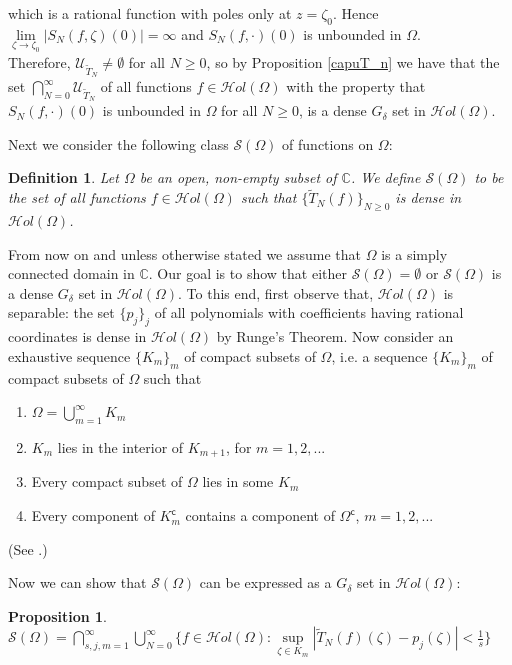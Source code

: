 \documentclass[11pt,twoside,a4paper]{article}
\newtheorem{proposition}[theorem]{Proposition}
\newtheorem{definition}[theorem]{Definition}
\theoremstyle{remark}
\def\d{\delta}
\newcommand{\holo}{{\mathcal Hol}(\Omega)}
\newcommand{\ttn}{\widetilde{T}_N}
\newcommand{\so}{\mathcal{S}(\Omega)}
\begin{document}
which is a rational function with poles only at $z= \zeta_0$. Hence $\lim \limits_{\zeta\rightarrow\zeta_0}|S_N(f,\zeta)(0)| = \infty$ and $S_N(f,\cdot)(0)$ is unbounded in $\Omega$.\\
Therefore, $\mathcal{U}_{\ttn} \neq \emptyset$ for all $N \geq 0$, so by Proposition \ref{capuT_n} we have that the set $\bigcap\limits_{N=0}^{\infty}\mathcal{U}_{\ttn}$ of all functions $f \in \holo$ with the property that $S_N(f,\cdot)(0)$ is unbounded in $\Omega$ for all $N \geq 0$, is a dense $G_\d$ set in $\holo$.
\par
Next we consider the following class $\so$ of functions on $\Omega$:
\begin{definition}
  Let $\Omega$ be an open, non-empty subset of $\mathbb{C}$. We define $\so$ to be the set of all functions $f \in \holo$ such that $\big\{  \ttn(f)\big\}_{N \geq 0}$ is dense in $\holo$.
\end{definition}
\label{so def}
From now on and unless otherwise stated we assume that $\Omega$ is a simply connected domain in $\mathbb{C}$.
Our goal is to show that either $\so = \emptyset$ or $\so$ is a dense $G_\d$ set in $\holo$. To this end, first observe that,  $\holo$ is separable: the set $\{p_j\}_j$ of all polynomials with coefficients having rational coordinates is dense in $\holo$ by Runge's Theorem. Now consider an exhaustive sequence $\{K_m\}_m$ of compact subsets of $\Omega$, i.e. a sequence $\{K_m\}_m$ of compact subsets of $\Omega$ such that
\begin{enumerate}
  \item $\Omega = \bigcup\limits_{m=1}^{\infty}K_m $
  \item $K_m$ lies in the interior of $K_{m+1}$, for $m=1,2,...$
  \item Every compact subset of $\Omega$ lies in some $K_m$
  \item Every component of $K_m^{\mathsf{c}}$ contains a component of $\Omega^{\mathsf{c}}$, $m=1,2,...$
\end{enumerate}
(See \cite{Rudin:1987:RCA:26851}.)
\par
Now we can show that $\so$ can be expressed as a $G_\d$ set in $\holo$:
\begin{proposition}
\label{so=}
 $ \so = \bigcap\limits_{s,j,m=1}^{\infty}\bigcup\limits_{N=0}^{\infty}\big\{ f \in \holo: \sup\limits_{\zeta \in K_m}|\ttn (f)(\zeta)-p_j(\zeta)| < \frac{1}{s}\big\}$
\end{proposition}
\end{document}
